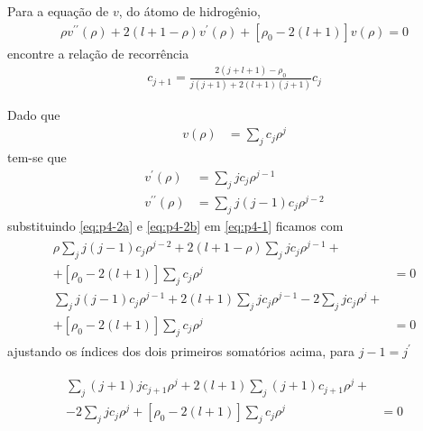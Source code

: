  \begin{prob}
	 Para a equação de $v$, do átomo de hidrogênio,
	 \begin{align}\label{eq:p4-1}
		 \rho v^{\prime\prime}(\rho)+2(l+1-\rho)v^{\prime}(\rho)+\left[\rho_{0}-2(l+1)\right]v(\rho)=0
	 \end{align}
	 encontre a relação de recorrência
	 \begin{align}
		 c_{j+1}	= \frac{2(j+l+1)-\rho_{0}}{j(j+1)+2(l+1)(j+1)}c_{j}
	 \end{align}

	 \begin{sol}
		 Dado que
		 \begin{align}
			 v(\rho) &= \sum_{j}c_{j} \rho^{j}
		 \end{align}
		 tem-se que
		 \begin{subequations}
			 \begin{align}
				 v^{\prime}(\rho) &= \sum_{j}jc_{j} \rho^{j-1}\label{eq:p4-2a}\\
				 v^{\prime\prime}(\rho) &= \sum_{j}j(j-1)c_{j} \rho^{j-2}\label{eq:p4-2b}
			 \end{align}	
		 \end{subequations}
		 substituindo \eqref{eq:p4-2a} e \eqref{eq:p4-2b} em \eqref{eq:p4-1} ficamos com
		 \begin{align}
			 \begin{split}
				 \rho\sum_jj(j-1)c_{j} \rho^{j-2}+2(l+1-\rho)\sum_{j}jc_{j} \rho^{j-1}+\\+[\rho_{0}-2(l+1)]\sum_{j}c_{j} \rho^{j} &= 0\\
				 \sum_{j}j(j-1)c_{j} \rho^{j-1}+2(l+1)\sum_{j}jc_{j} \rho^{j-1}-2\sum_{j}jc_{j} \rho^{j}+\\+[\rho_{0}-2(l+1)]\sum_{j}c_{j} \rho^{j} &= 0
			 \end{split}
		 \end{align}
		 ajustando os índices dos dois primeiros somatórios acima, para $j-1=j^{\prime}$
	 \end{sol}
	 \begin{align}
		 \begin{split}
			 \sum_{j}(j+1)jc_{j+1} \rho^{j}+2(l+1)\sum_{j}(j+1)c_{j+1} \rho^{j}+\\-2\sum_{j}jc_{j} \rho^{j}+[\rho_{0}-2(l+1)]\sum_{j}c_{j} \rho^{j} &= 0
		 \end{split}	
	 \end{align}

\end{prob}
